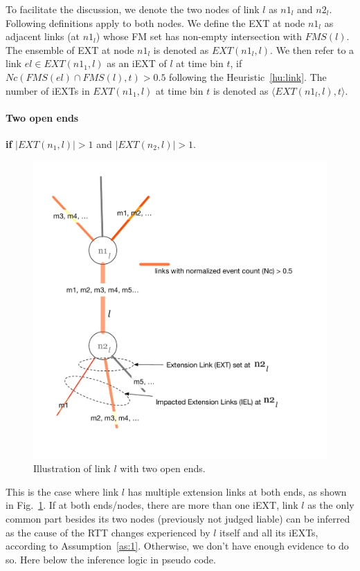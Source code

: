 To facilitate the discussion, we denote the two nodes of link $l$ as $n1_l$ and $n2_l$.
Following definitions apply to both nodes.
We define the \acf{EXT} at node $n1_l$ as adjacent links (at $n1_l$) whose \ac{FM} set has non-empty intersection with $FMS(l)$.
The ensemble of \ac{EXT} at node $n1_l$ is denoted as $EXT(n1_l, l)$.
We then refer to a link $el \in EXT(n1_1, l)$ as an \acf{iEXT} of $l$ at time bin $t$, if $Nc(FMS(el) \cap FMS(l), t) > 0.5$ following the Heuristic~\ref{hu:link}.
The number of \acp{iEXT} in $EXT(n1_1, l)$ at time bin $t$ is denoted as $\langle EXT(n1_l, l), t \rangle$. 


\paragraph{Two open ends} \textbf{if} $|EXT(n_1, l)| >1$ and $|EXT(n_2, l)| > 1$.

\begin{figure}[!htb]
\centering
\includegraphics[width=.9\textwidth]{gfx/chap5/two_open_ends.pdf}
\caption{Illustration of link $l$ with two open ends.}
\label{fig:chap5_two_open_ends}
\end{figure}

This is the case where link $l$ has multiple extension links at both ends, as shown in Fig.~\ref{fig:chap5_two_open_ends}. 
If at both ends/nodes, there are more than one \ac{iEXT}, link $l$ as the only common part besides its two nodes (previously not judged liable) can be inferred as the cause of the RTT changes experienced by $l$ itself and all its \acp{iEXT}, according to Assumption~\ref{as:1}.
Otherwise, we don't have enough evidence to do so. Here below the inference logic in pseudo code.

